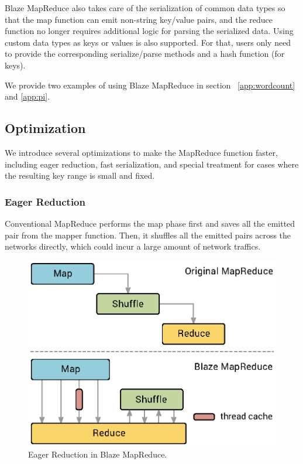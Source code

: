 Blaze MapReduce also takes care of the serialization of common data types so that the map function can emit non-string key/value pairs, and the reduce function no longer requires additional logic for parsing the serialized data.
Using custom data types as keys or values is also supported. For that, users only need to provide the corresponding serialize/parse methods and a hash function (for keys).

We provide two examples of using Blaze MapReduce in section ~\ref{app:wordcount} and \ref{app:pi}.

\subsection{Optimization}
\label{sec:opt}
We introduce several optimizations to make the MapReduce function faster, including eager reduction, fast serialization, and special treatment for cases where the resulting key range is small and fixed.

\subsubsection{Eager Reduction}

Conventional MapReduce performs the map phase first and saves all the emitted pair from the mapper function.
Then, it shuffles all the emitted pairs across the networks directly, which could incur a large amount of network traffics.

\begin{figure}
  \begin{center}
  \includegraphics[width=0.7\linewidth]{figs/mrDiff0.eps}
  \end{center}
  \vspace{-0.2cm}
  \caption{Eager Reduction in Blaze MapReduce.
  }
  \label{fig:mrdiff}
\end{figure}

